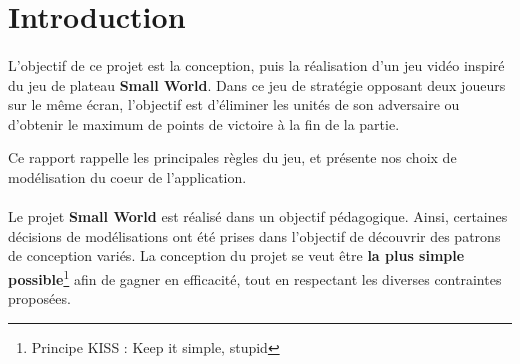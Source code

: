 \section*{Introduction}

\paragraph{}
L'objectif de ce projet est la conception, puis la réalisation d'un jeu vidéo inspiré du jeu de plateau \textbf{Small World}.
Dans ce jeu de stratégie opposant deux joueurs sur le même écran, l'objectif est d'éliminer les unités de son adversaire ou d'obtenir le maximum de points de victoire à la fin de la partie.

Ce rapport rappelle les principales règles du jeu, et présente nos choix de modélisation du coeur de l'application.

\paragraph{}
Le projet \textbf{Small World} est réalisé dans un objectif pédagogique. Ainsi, certaines décisions de modélisations ont été prises dans l'objectif de découvrir des patrons de conception variés.
La conception du projet se veut être \textbf{la plus simple possible}\footnote{Principe KISS : \og{} Keep it simple, stupid \fg{}} afin de gagner en efficacité, tout en respectant les diverses contraintes proposées.


